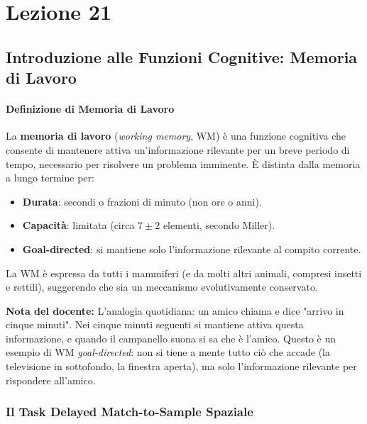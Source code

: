 \chapter{Lezione 21}




\section{Introduzione alle Funzioni Cognitive: Memoria di Lavoro}

\subsubsection{Definizione di Memoria di Lavoro}

La \textbf{memoria di lavoro} (\textit{working memory}, WM) è una funzione cognitiva che consente di mantenere attiva un'informazione rilevante per un breve periodo di tempo, necessario per risolvere un problema imminente. È distinta dalla memoria a lungo termine per:
\begin{itemize}
    \item \textbf{Durata}: secondi o frazioni di minuto (non ore o anni).
    \item \textbf{Capacità}: limitata (circa $7\pm2$ elementi, secondo Miller).
    \item \textbf{Goal-directed}: si mantiene solo l'informazione rilevante al compito corrente.
\end{itemize}

La WM è espressa da tutti i mammiferi (e da molti altri animali, compresi insetti e rettili), suggerendo che sia un meccanismo evolutivamente conservato.

\begin{tcolorbox}[colback=gray!5, colframe=gray!40, arc=2mm, boxrule=0.5pt]
\textbf{Nota del docente:} L'analogia quotidiana: un amico chiama e dice "arrivo in cinque minuti". Nei cinque minuti seguenti si mantiene attiva questa informazione, e quando il campanello suona si sa che è l'amico. Questo è un esempio di WM \textit{goal-directed}: non si tiene a mente tutto ciò che accade (la televisione in sottofondo, la finestra aperta), ma solo l'informazione rilevante per rispondere all'amico.
\end{tcolorbox}


\subsection{Il Task Delayed Match-to-Sample Spaziale}

